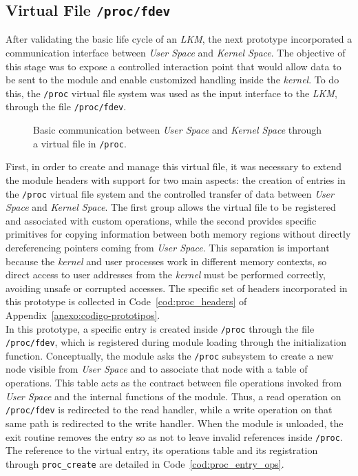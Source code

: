 \

\subsection{Virtual File \texttt{/proc/fdev}}

After validating the basic life cycle of an \textit{LKM}, the next prototype incorporated a communication interface between \textit{User Space} and \textit{Kernel Space}.
The objective of this stage was to expose a controlled interaction point that would allow data to be sent to the module and enable customized handling inside the \textit{kernel}.
To do this, the \texttt{/proc} virtual file system was used as the input interface to the \textit{LKM}, through the file \texttt{/proc/fdev}.\\

\begin{figure}[h!]
  \centering
  \scalebox{1}{}
  \caption{Basic communication between \textit{User Space} and \textit{Kernel Space} through a virtual file in \texttt{/proc}.}
  \label{fig:proc_fdev_scheme}
\end{figure}

First, in order to create and manage this virtual file, it was necessary to extend the module headers with support for two main aspects: the creation of entries in the \texttt{/proc} virtual file system and the controlled transfer of data between \textit{User Space} and \textit{Kernel Space}.
The first group allows the virtual file to be registered and associated with custom operations, while the second provides specific primitives for copying information between both memory regions without directly dereferencing pointers coming from \textit{User Space}.
This separation is important because the \textit{kernel} and user processes work in different memory contexts, so direct access to user addresses from the \textit{kernel} must be performed correctly, avoiding unsafe or corrupted accesses.
The specific set of headers incorporated in this prototype is collected in Code~\ref{cod:proc_headers} of Appendix~\ref{anexo:codigo-prototipos}.\\

In this prototype, a specific entry is created inside \texttt{/proc} through the file \texttt{/proc/fdev}, which is registered during module loading through the initialization function.
Conceptually, the module asks the \texttt{/proc} subsystem to create a new node visible from \textit{User Space} and to associate that node with a table of operations.
This table acts as the contract between file operations invoked from \textit{User Space} and the internal functions of the module.
Thus, a read operation on \texttt{/proc/fdev} is redirected to the read handler, while a write operation on that same path is redirected to the write handler.
When the module is unloaded, the exit routine removes the entry so as not to leave invalid references inside \texttt{/proc}.
The reference to the virtual entry, its operations table and its registration through \texttt{proc\_create} are detailed in Code~\ref{cod:proc_entry_ops}.\\

